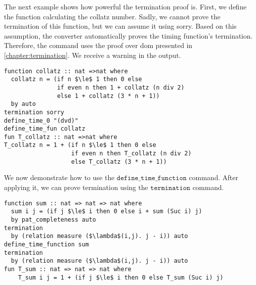 The next example shows how powerful the termination proof is.
First, we define the function calculating the collatz number.
Sadly, we cannot prove the termination of this function, but we can assume it using sorry.
Based on this assumption, the converter automatically proves the timing function's termination.
Therefore, the command uses the proof over dom presented in \autoref{chapter:termination}.
We receive a warning in the output.
\begin{lstlisting}[language=isabelle,mathescape=true,keepspaces]
function collatz :: nat =>nat where
  collatz n = (if n $\le$ 1 then 0 else
               if even n then 1 + collatz (n div 2)
               else 1 + collatz (3 * n + 1))
  by auto
termination sorry
define_time_0 "(dvd)"
define_time_fun collatz
fun T_collatz :: nat =>nat where
T_collatz n = 1 + (if n $\le$ 1 then 0 else
                   if even n then T_collatz (n div 2)
                   else T_collatz (3 * n + 1))
\end{lstlisting}

We now demonstrate how to use the $\texttt{define\_time\_function}$ command.
After applying it, we can prove termination using the $\texttt{termination}$ command.

\begin{lstlisting}[language=isabelle,mathescape=true]
function sum :: nat => nat => nat where
  sum i j = (if j $\le$ i then 0 else i + sum (Suc i) j)
  by pat_completeness auto
termination
  by (relation measure ($\lambda$(i,j). j - i)) auto
define_time_function sum
termination
  by (relation measure ($\lambda$(i,j). j - i)) auto
fun T_sum :: nat => nat => nat where
    T_sum i j = 1 + (if j $\le$ i then 0 else T_sum (Suc i) j)
\end{lstlisting}

